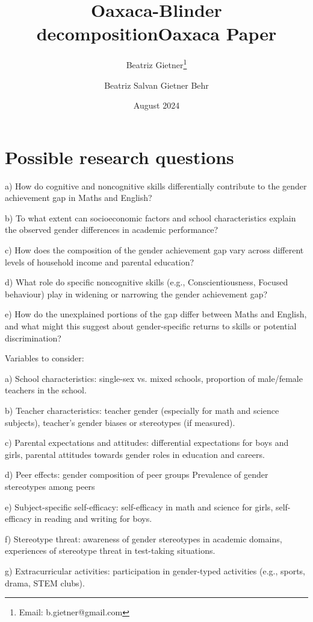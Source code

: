 \documentclass[12pt,a4paper,onecolumn]{article}
\title{\vspace{-2cm}\Large\textbf{Oaxaca-Blinder decomposition}}
\author[]{Beatriz Gietner\thanks{Email: b.gietner@gmail.com}}
\affil{University College Dublin}
\date{}
\title{Oaxaca Paper}
\author{Beatriz Salvan Gietner Behr}
\date{August 2024}
\numberwithin{equation}{section}
\begin{document}
\maketitle

\section{Possible research questions}

a) How do cognitive and noncognitive skills differentially contribute to the gender achievement gap in Maths and English?

b) To what extent can socioeconomic factors and school characteristics explain the observed gender differences in academic performance?

c) How does the composition of the gender achievement gap vary across different levels of household income and parental education?

d) What role do specific noncognitive skills (e.g., Conscientiousness, Focused behaviour) play in widening or narrowing the gender achievement gap?

e) How do the unexplained portions of the gap differ between Maths and English, and what might this suggest about gender-specific returns to skills or potential discrimination?

Variables to consider: 

a) School characteristics: single-sex vs. mixed schools, proportion of male/female teachers in the school. \textcite{lee2018}

b) Teacher characteristics: teacher gender (especially for math and science subjects), teacher's gender biases or stereotypes (if measured).  \textcite{dee2007}

c) Parental expectations and attitudes: differential expectations for boys and girls, parental attitudes towards gender roles in education and careers. \textcite{jacobs2002} 

d) Peer effects: gender composition of peer groups
Prevalence of gender stereotypes among peers

e) Subject-specific self-efficacy: self-efficacy in math and science for girls, self-efficacy in reading and writing for boys.

f) Stereotype threat: awareness of gender stereotypes in academic domains, experiences of stereotype threat in test-taking situations.

g) Extracurricular activities: participation in gender-typed activities (e.g., sports, drama, STEM clubs).
\end{document}
